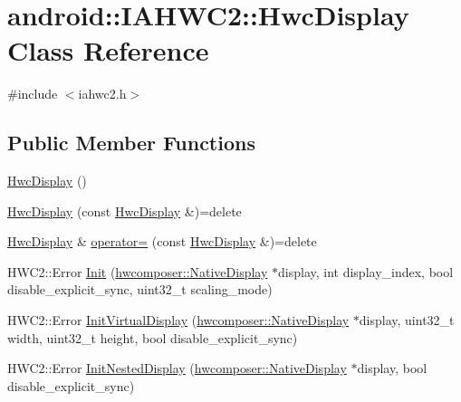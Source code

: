 \hypertarget{classandroid_1_1IAHWC2_1_1HwcDisplay}{}\section{android\+:\+:I\+A\+H\+WC2\+:\+:Hwc\+Display Class Reference}
\label{classandroid_1_1IAHWC2_1_1HwcDisplay}


{\ttfamily \#include $<$iahwc2.\+h$>$}

\subsection*{Public Member Functions}
\begin{DoxyCompactItemize}
\item 
\mbox{\hyperlink{classandroid_1_1IAHWC2_1_1HwcDisplay_ac2608957e4e981b04d89ccc25da9c460}{Hwc\+Display}} ()
\item 
\mbox{\hyperlink{classandroid_1_1IAHWC2_1_1HwcDisplay_affdca7e920257f9fabd9c829d3c6f036}{Hwc\+Display}} (const \mbox{\hyperlink{classandroid_1_1IAHWC2_1_1HwcDisplay}{Hwc\+Display}} \&)=delete
\item 
\mbox{\hyperlink{classandroid_1_1IAHWC2_1_1HwcDisplay}{Hwc\+Display}} \& \mbox{\hyperlink{classandroid_1_1IAHWC2_1_1HwcDisplay_ae648da2a5ddf4cbcc5531402fb63f394}{operator=}} (const \mbox{\hyperlink{classandroid_1_1IAHWC2_1_1HwcDisplay}{Hwc\+Display}} \&)=delete
\item 
H\+W\+C2\+::\+Error \mbox{\hyperlink{classandroid_1_1IAHWC2_1_1HwcDisplay_abbc9a0659cb5229f3b8741e9823190e2}{Init}} (\mbox{\hyperlink{classhwcomposer_1_1NativeDisplay}{hwcomposer\+::\+Native\+Display}} $\ast$display, int display\+\_\+index, bool disable\+\_\+explicit\+\_\+sync, uint32\+\_\+t scaling\+\_\+mode)
\item 
H\+W\+C2\+::\+Error \mbox{\hyperlink{classandroid_1_1IAHWC2_1_1HwcDisplay_aca926207d2bfcbd4599519c6bef5ce76}{Init\+Virtual\+Display}} (\mbox{\hyperlink{classhwcomposer_1_1NativeDisplay}{hwcomposer\+::\+Native\+Display}} $\ast$display, uint32\+\_\+t width, uint32\+\_\+t height, bool disable\+\_\+explicit\+\_\+sync)
\item 
H\+W\+C2\+::\+Error \mbox{\hyperlink{classandroid_1_1IAHWC2_1_1HwcDisplay_a87a9694e43f5d0aed5735efccbde0a7e}{Init\+Nested\+Display}} (\mbox{\hyperlink{classhwcomposer_1_1NativeDisplay}{hwcomposer\+::\+Native\+Display}} $\ast$display, bool disable\+\_\+explicit\+\_\+sync)
\item 

\end{DoxyCompactItemize}
